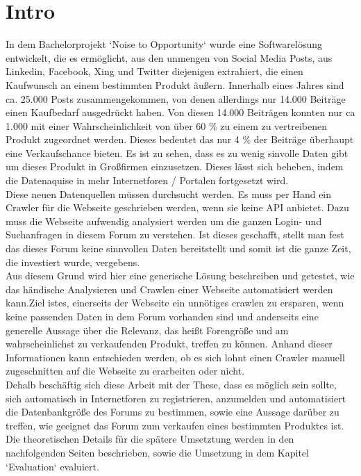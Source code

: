 \section {Intro}
In dem Bachelorprojekt `Noise to Opportunity` wurde eine Softwarelösung entwickelt, die es ermöglicht, aus den unmengen von Social Media Posts, aus Linkedin, Facebook, Xing und Twitter diejenigen extrahiert, die einen Kaufwunsch an einem bestimmten Produkt äußern. Innerhalb eines Jahres sind ca. 25.000 Posts zusammengekommen, von denen allerdings nur 14.000 Beiträge einen Kaufbedarf ausgedrückt haben. Von diesen 14.000 Beiträgen konnten nur ca 1.000 mit einer Wahrscheinlichkeit von über 60 \% zu einem zu vertreibenen Produkt zugeordnet werden. Dieses bedeutet das nur 4 \% der Beiträge überhaupt eine Verkaufschance bieten.
Es ist zu sehen, dass es zu wenig sinvolle Daten gibt um dieses Produkt in Großfirmen einzusetzen. Dieses lässt sich beheben, indem die Datenaquise in mehr Internetforen / Portalen fortgesetzt wird.\\
Diese neuen Datenquellen müssen durchsucht werden. Es muss per Hand ein Crawler für die Webseite geschrieben werden, wenn sie keine API anbietet. Dazu muss die Webseite aufwendig analysiert werden um die ganzen Login- und Suchanfragen in diesem Forum zu verstehen. Ist dieses geschafft, stellt man fest das dieses Forum keine sinnvollen Daten bereitstellt und somit ist die ganze Zeit, die investiert wurde, vergebens.\\
Aus diesem Grund wird hier eine generische Lösung beschreiben und getestet, wie das händische Analysieren und Crawlen einer Webseite automatisiert werden kann.Ziel istes, einerseits der Webseite ein unnötiges crawlen zu ersparen, wenn keine passenden Daten in dem Forum vorhanden sind und anderseits eine generelle Aussage über die Relevanz, das heißt Forengröße und am wahrscheinlichst zu verkaufenden Produkt, treffen zu können. Anhand dieser Informationen kann entschieden werden, ob es sich lohnt einen Crawler manuell zugeschnitten auf die Webseite zu erarbeiten oder nicht.\\
Dehalb beschäftig sich diese Arbeit mit der These, dass es möglich sein sollte, sich automatisch in Internetforen zu registrieren, anzumelden und automatisiert die Datenbankgröße des Forums zu bestimmen, sowie eine Aussage darüber zu treffen, wie geeignet das Forum zum verkaufen eines bestimmten Produktes ist. Die theoretischen Details für die spätere Umsetztung werden in den nachfolgenden Seiten beschrieben, sowie die Umsetzung in dem Kapitel `Evaluation` evaluiert.
\newpage
